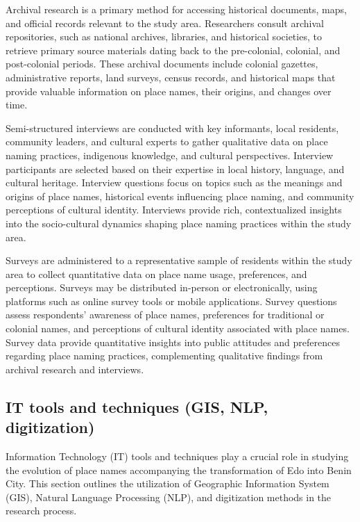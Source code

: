 Archival research is a primary method for accessing historical documents, maps, and official records relevant to the study area. Researchers consult archival repositories, such as national archives, libraries, and historical societies, to retrieve primary source materials dating back to the pre-colonial, colonial, and post-colonial periods. These archival documents include colonial gazettes, administrative reports, land surveys, census records, and historical maps that provide valuable information on place names, their origins, and changes over time.

Semi-structured interviews are conducted with key informants, local residents, community leaders, and cultural experts to gather qualitative data on place naming practices, indigenous knowledge, and cultural perspectives. Interview participants are selected based on their expertise in local history, language, and cultural heritage. Interview questions focus on topics such as the meanings and origins of place names, historical events influencing place naming, and community perceptions of cultural identity. Interviews provide rich, contextualized insights into the socio-cultural dynamics shaping place naming practices within the study area.

Surveys are administered to a representative sample of residents within the study area to collect quantitative data on place name usage, preferences, and perceptions. Surveys may be distributed in-person or electronically, using platforms such as online survey tools or mobile applications. Survey questions assess respondents' awareness of place names, preferences for traditional or colonial names, and perceptions of cultural identity associated with place names. Survey data provide quantitative insights into public attitudes and preferences regarding place naming practices, complementing qualitative findings from archival research and interviews.
\subsection{IT tools and techniques (GIS, NLP, digitization)}
Information Technology (IT) tools and techniques play a crucial role in studying the evolution of place names accompanying the transformation of Edo into Benin City. This section outlines the utilization of Geographic Information System (GIS), Natural Language Processing (NLP), and digitization methods in the research process.
